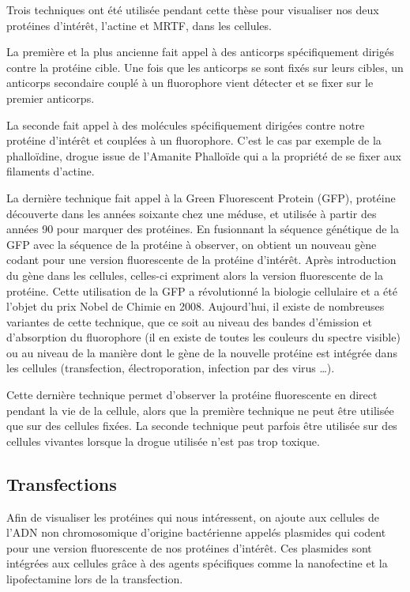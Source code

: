 \documentclass{report}
\begin{document}
	Trois techniques ont été utilisée pendant cette thèse pour visualiser nos deux protéines d'intérêt, l'actine et MRTF, dans les cellules. 
	
	La première et la plus ancienne fait appel à des anticorps spécifiquement dirigés contre la protéine cible. Une fois que les anticorps se sont fixés sur leurs cibles, un anticorps secondaire couplé à un fluorophore vient détecter et se fixer sur le premier anticorps. 
	
	La seconde fait appel à des molécules spécifiquement dirigées contre notre protéine d'intérêt et couplées à un fluorophore. C'est le cas par exemple de la phalloïdine, drogue issue de l'Amanite Phalloïde qui a la propriété de se fixer aux filaments d'actine.	
	
	La dernière technique fait appel à la Green Fluorescent Protein (GFP), protéine découverte dans les années soixante chez une méduse, et utilisée à partir des années 90 pour marquer des protéines. En fusionnant la séquence génétique de la GFP avec la séquence de la protéine à observer, on obtient un nouveau gène codant pour une version fluorescente de la protéine d'intérêt. Après introduction du gène dans les cellules, celles-ci expriment alors la version fluorescente de la protéine. Cette utilisation de la GFP a révolutionné la biologie cellulaire et a été l'objet du prix Nobel de Chimie en 2008. Aujourd'hui, il existe de nombreuses variantes de cette technique, que ce soit au niveau des bandes d'émission et d'absorption du fluorophore (il en existe de toutes les couleurs du spectre visible) ou au niveau de la manière dont le gène de la nouvelle protéine est intégrée dans les cellules (transfection, électroporation, infection par des virus  \dots).
	
	Cette dernière technique permet d'observer la protéine fluorescente en direct pendant la vie de la cellule, alors que la première technique ne peut être utilisée que sur des cellules fixées. La seconde technique peut parfois être utilisée sur des cellules vivantes lorsque la drogue utilisée n'est pas trop toxique. 
	\subsection{Transfections}
	Afin de visualiser les protéines qui nous intéressent, on ajoute aux cellules de l'ADN non chromosomique d'origine bactérienne appelés plasmides qui codent pour une version fluorescente de nos protéines d'intérêt. Ces plasmides sont intégrées aux cellules grâce à des agents spécifiques comme la nanofectine et la lipofectamine lors de la transfection. 
	
\end{document}
